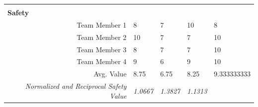 \documentclass[12pt]{article}
\begin{document}
\begin{table}[h]
{\begin{tabular}{rllll}
\multicolumn{1}{l}{}                           &                                                                   &                                                                   &                                                                   &                           \\
\multicolumn{1}{l}{\textbf{Safety}}            &                                                                   &                                                                   &                                                                   &                           \\ \cline{1-1}
Team Member 1                                  & 8                                                                 & 7                                                                 & 10                                                                & 8                         \\
Team Member 2                                  & 10                                                                & 7                                                                 & 7                                                                 & 10                        \\
Team Member 3                                  & 8                                                                 & 7                                                                 & 7                                                                 & 10                        \\
Team Member 4                                  & 9                                                                 & 6                                                                 & 9                                                                 & 10                        \\
Avg. Value                                     & 8.75                                                              & 6.75                                                              & 8.25                                                              & 9.333333333               \\
\rowcolor[HTML]{C0C0C0} 
\textit{Normalized and Reciprocal Safety Value}               & \multicolumn{1}{r}{\cellcolor[HTML]{C0C0C0}\textit{1.0667}}       & \multicolumn{1}{r}{\cellcolor[HTML]{C0C0C0}\textit{1.3827}} & \multicolumn{1}{r}{\cellcolor[HTML]{C0C0C0}\textit{1.1313}} & \textit{}                 \\

\end{tabular}}
\end{table}
\end{document}
